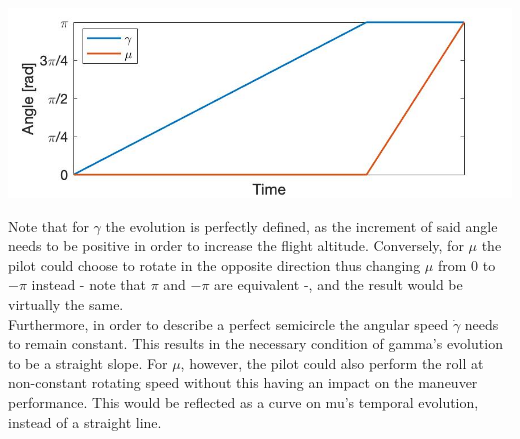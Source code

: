 	\includegraphics[width=\linewidth]{../matlab/paramEvolution.jpg}
	\label{fig:paramEvolution}
	\vspace{0.5cm}

Note that for $\gamma$ the evolution is perfectly defined, as the increment of said angle needs to be positive in order to increase the flight altitude. Conversely, for $\mu$ the pilot could choose to rotate in the opposite direction thus changing $\mu$ from 0 to $-\pi$ instead - note that $\pi$ and $-\pi$ are equivalent -, and the result would be virtually the same.\\
Furthermore, in order to describe a perfect semicircle the angular speed $\dot{\gamma}$ needs to remain constant. This results in the necessary condition of gamma's evolution to be a straight slope. For $\mu$, however, the pilot could also perform the roll at non-constant rotating speed without this having an impact on the maneuver performance. This would be reflected as a curve on mu's temporal evolution, instead of a straight line.

